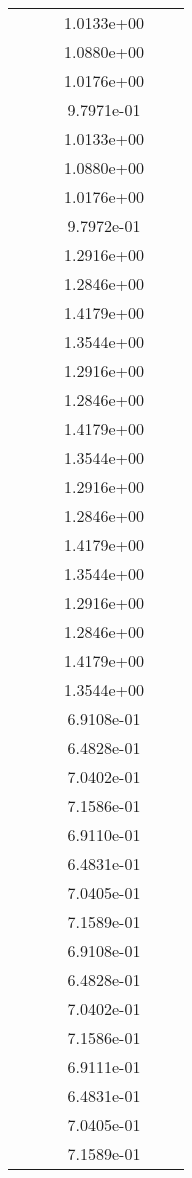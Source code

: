 \begin{xltabular}{\textwidth}{r|rS[table-format=1.3e+2]S[table-format=1.4e+2]S[table-format=1.4e+2]S[table-format=-1.5]}
&  &  & 1.0133e+00 & & \\
&  &  & 1.0880e+00 & & \\
&  &  & 1.0176e+00 & & \\
&  &  & 9.7971e-01 & & \\
&  &  & 1.0133e+00 & & \\
&  &  & 1.0880e+00 & & \\
&  &  & 1.0176e+00 & & \\
&  &  & 9.7972e-01 & & \\
&  &  & 1.2916e+00 & & \\
&  &  & 1.2846e+00 & & \\
&  &  & 1.4179e+00 & & \\
&  &  & 1.3544e+00 & & \\
&  &  & 1.2916e+00 & & \\
&  &  & 1.2846e+00 & & \\
&  &  & 1.4179e+00 & & \\
&  &  & 1.3544e+00 & & \\
&  &  & 1.2916e+00 & & \\
&  &  & 1.2846e+00 & & \\
&  &  & 1.4179e+00 & & \\
&  &  & 1.3544e+00 & & \\
&  &  & 1.2916e+00 & & \\
&  &  & 1.2846e+00 & & \\
&  &  & 1.4179e+00 & & \\
&  &  & 1.3544e+00 & & \\
&  &  & 6.9108e-01 & & \\
&  &  & 6.4828e-01 & & \\
&  &  & 7.0402e-01 & & \\
&  &  & 7.1586e-01 & & \\
&  &  & 6.9110e-01 & & \\
&  &  & 6.4831e-01 & & \\
&  &  & 7.0405e-01 & & \\
&  &  & 7.1589e-01 & & \\
&  &  & 6.9108e-01 & & \\
&  &  & 6.4828e-01 & & \\
&  &  & 7.0402e-01 & & \\
&  &  & 7.1586e-01 & & \\
&  &  & 6.9111e-01 & & \\
&  &  & 6.4831e-01 & & \\
&  &  & 7.0405e-01 & & \\
&  &  & 7.1589e-01 & & \\

\end{xltabular}
